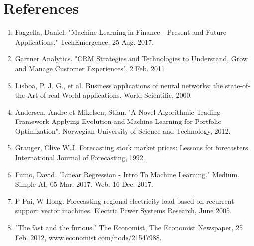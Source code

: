 \documentclass[12pt]{report}
\begin{document}
\section*{ References}

\begin{enumerate}
\item Faggella, Daniel. "Machine Learning in Finance - Present and Future Applications." TechEmergence, 25 Aug. 2017.
\item Gartner Analytics. "CRM Strategies and Technologies to Understand, Grow and Manage Customer Experiences", 2 Feb. 2011
\item Lisboa, P. J. G., et al. Business applications of neural networks: the state-of-the-Art of real-World applications. World Scientific, 2000.
\item Andersen, Andre et Mikelsen, Stian. "A Novel Algorithmic Trading Framework Applying Evolution and Machine Learning for Portfolio Optimization". Norwegian University of Science and Technology, 2012.
\item Granger, Clive W.J. Forecasting stock market prices: Lessons
for forecasters. International Journal of Forecasting, 1992.
\item Fumo, David. "Linear Regression - Intro To Machine Learning." Medium. Simple AI, 05 Mar. 2017. Web. 16 Dec. 2017.
\item P Pai, W Hong. Forecasting regional electricity load based on recurrent support vector machines. Electric Power Systems
Research, June 2005.
\item "The fast and the furious." The Economist, The Economist Newspaper, 25 Feb. 2012, www.economist.com/node/21547988.
\end{enumerate}
\end{document}
